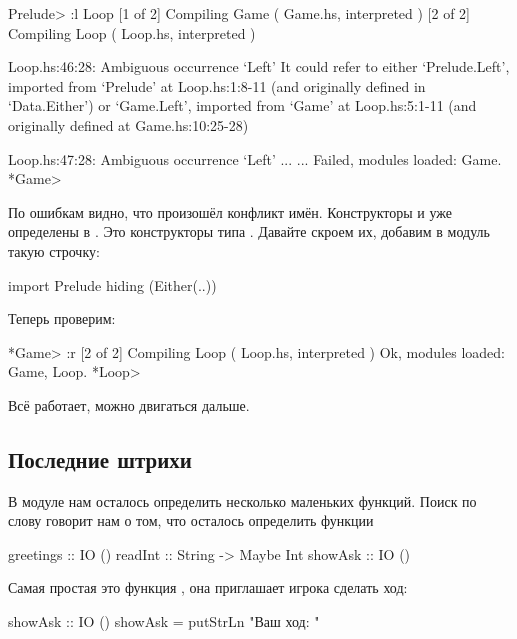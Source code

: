 \begin{code}
Prelude> :l Loop
[1 of 2] Compiling Game             ( Game.hs, interpreted )
[2 of 2] Compiling Loop             ( Loop.hs, interpreted )

Loop.hs:46:28:
    Ambiguous occurrence `Left'
    It could refer to either `Prelude.Left',
                             imported from `Prelude' at Loop.hs:1:8-11
                             (and originally defined in `Data.Either')
                          or `Game.Left',
                             imported from `Game' at Loop.hs:5:1-11
                             (and originally defined at Game.hs:10:25-28)

Loop.hs:47:28:
    Ambiguous occurrence `Left'
...
...
Failed, modules loaded: Game.
*Game> 
\end{code}

По ошибкам видно, что произошёл конфликт имён. Конструкторы
 и  уже определены в . Это конструкторы
типа . Давайте скроем их, добавим в модуль такую строчку:

\begin{code}
import Prelude hiding (Either(..))
\end{code}

Теперь проверим:

\begin{code}
*Game> :r
[2 of 2] Compiling Loop             ( Loop.hs, interpreted )
Ok, modules loaded: Game, Loop.
*Loop> 
\end{code}

Всё работает, можно двигаться дальше.

\subsection{Последние штрихи}

В модуле  нам осталось определить несколько маленьких
функций. Поиск по слову  говорит нам о том, что
осталось определить функции \In{}


\begin{code}
greetings   :: IO ()
readInt     :: String -> Maybe Int
showAsk     :: IO ()
\end{code}

Самая простая это функция , она
приглашает игрока сделать ход:

\begin{code}
showAsk :: IO ()
showAsk = putStrLn "Ваш ход: "
\end{code}

